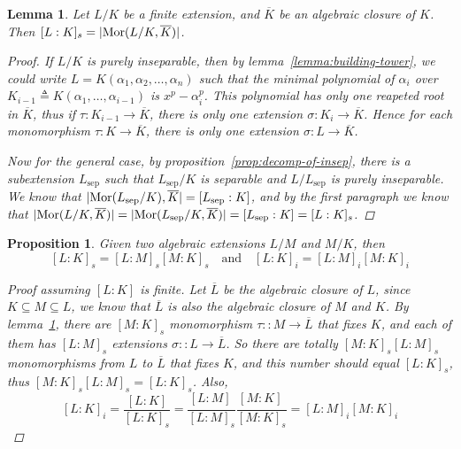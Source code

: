 \documentclass[a4paper]{article}
\DeclarePairedDelimiter{\abs}{\lvert}{\rvert}
\newcommand{\defeq}{\triangleq}
\DeclareMathOperator{\Mor}{Mor}
\newtheorem{lemma}{Lemma}
\theoremstyle{remark}
\theoremstyle{definition}
\theoremstyle{definition}
\theoremstyle{plain}
\newtheorem{proposition}{Proposition}
\begin{document}
  \begin{lemma} \label{lemma:number-of-ext-equal-sep-deg}
    Let $L/K$ be a finite extension, and $\overline{K}$ be an algebraic closure of $K$.
    Then $[L: K]_s = \abs{\Mor(L/K, \overline{K})}$.

    \begin{proof}
      If $L/K$ is purely inseparable, then by lemma~\ref{lemma:building-tower}, we could write
      $L = K(\alpha_1, \alpha_2, \dots, \alpha_n)$ such that the minimal polynomial of $\alpha_i$
      over $K_{i-1} \defeq K(\alpha_1, \dots, \alpha_{i-1})$ is $x^p - \alpha_i^p$.
      This polynomial has only one reapeted root in $\overline{K}$, thus if $\tau: K_{i-1} \to \overline{K}$,
      there is only one extension $\sigma: K_i \to \overline{K}$. Hence
      for each monomorphism $\tau: K \to \overline{K}$, there is only one extension $\sigma: L \to \overline{K}$.

      Now for the general case, by proposition~\ref{prop:decomp-of-insep}, there is a subextension
      $L_\text{sep}$ such that $L_\text{sep} / K$ is separable and $L / L_\text{sep}$ is purely inseparable.
      We know that $\abs{\Mor(L_\text{sep}/K), \overline{K}} = [L_\text{sep}: K]$, and by the
      first paragraph we know that $\abs{\Mor(L/K, \overline{K})} = \abs{\Mor(L_\text{sep}/K, \overline{K})}
      = [L_\text{sep}: K] = [L: K]_s$.
    \end{proof}
  \end{lemma}

  \begin{proposition} \label{prop:final-prop}
    Given two algebraic extensions $L/M$ and $M/K$, then
    \[ [L: K]_s = [L: M]_s [M:K]_s \quad \mathrm{and} \quad [L: K]_i = [L: M]_i [M: K]_i \]

    \begin{proof}[Proof assuming \({[L: K]}\) is finite]
      Let $\overline{L}$ be the algebraic closure of $L$, since $K \subseteq M \subseteq L$,
      we know that $\overline{L}$ is also the algebraic closure of $M$ and $K$.
      By lemma~\ref{lemma:number-of-ext-equal-sep-deg}, there are $[M: K]_s$ monomorphism
      $\tau :: M \to \overline{L}$ that fixes $K$, and each of them has $[L: M]_s$ extensions
      $\sigma :: L \to \overline{L}$. So there are totally $[M: K]_s [L: M]_s$ monomorphisms
      from $L$ to $\overline{L}$ that fixes $K$, and this number should equal $[L: K]_s$,
      thus $[M: K]_s [L: M]_s = [L: K]_s$. Also,
      \[ [L: K]_i = \frac{[L: K]}{[L: K]_s} = \frac{[L: M]_{\ }}{[L: M]_s}\frac{[M: K]_{\ }}{[M: K]_s} =
        [L: M]_i [M: K]_i \]
    \end{proof}
  \end{proposition}
\end{document}
